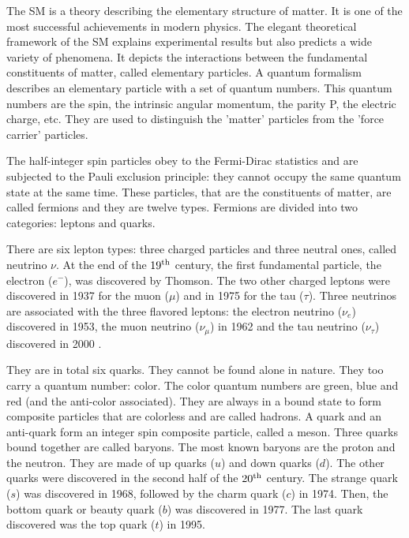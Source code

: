     The \acrfull{SM} is a theory describing the elementary structure of matter. 
    It is one of the most successful achievements in modern physics.
    The elegant theoretical framework of the \gls{SM} explains experimental results but also predicts a wide variety of phenomena.
    It depicts the interactions between the fundamental constituents of matter, called elementary particles.
    A quantum formalism describes an elementary particle with a set of quantum numbers.
    This quantum numbers are the spin, the intrinsic angular momentum, the parity P, the electric charge, etc.
    They are used to distinguish the 'matter' particles from the 'force carrier' particles.
    
    The half-integer spin particles obey to the Fermi-Dirac statistics and are subjected to the Pauli exclusion principle: they cannot occupy the same quantum state at the same time.
    These particles, that are the constituents of matter, are called fermions and they are twelve types.
    Fermions are divided into two categories: leptons and quarks. 
    
    There are six lepton types: three charged particles and three neutral ones, called neutrino $\nu$.
    At the end of the $19^{\rm{th}}$ century, the first fundamental particle, the electron ($e^{-}$), was discovered by Thomson.
    The two other charged leptons were discovered in 1937 for the muon ($\mu$) and in 1975 for the tau ($\tau$).
    Three neutrinos are associated with the three flavored leptons: the electron neutrino ($\nu_e$) discovered in 1953, the muon neutrino ($\nu_{\mu}$) in 1962 \cite{Erwin1961} and the tau neutrino ($\nu_{\tau}$) discovered in 2000 \cite{DONUT2000}.

    They are in total six quarks.
    They cannot be found alone in nature.
    They too carry a quantum number: color.
    The color quantum numbers are green, blue and red (and the anti-color associated).
    They are always in a bound state to form composite particles that are colorless and are called hadrons.
    A quark and an anti-quark form an integer spin composite particle, called a meson.
    Three quarks bound together are called baryons. 
    The most known baryons are the proton and the neutron.
    They are made of up quarks ($u$) and down quarks ($d$).
    The other quarks were discovered in the second half of the $20^{\rm{th}}$ century.
    The strange quark ($s$) was discovered in 1968, followed by the charm quark ($c$) in 1974.
    Then, the bottom quark or beauty quark ($b$) was discovered in 1977.
    The last quark discovered was the top quark ($t$) in 1995.  

